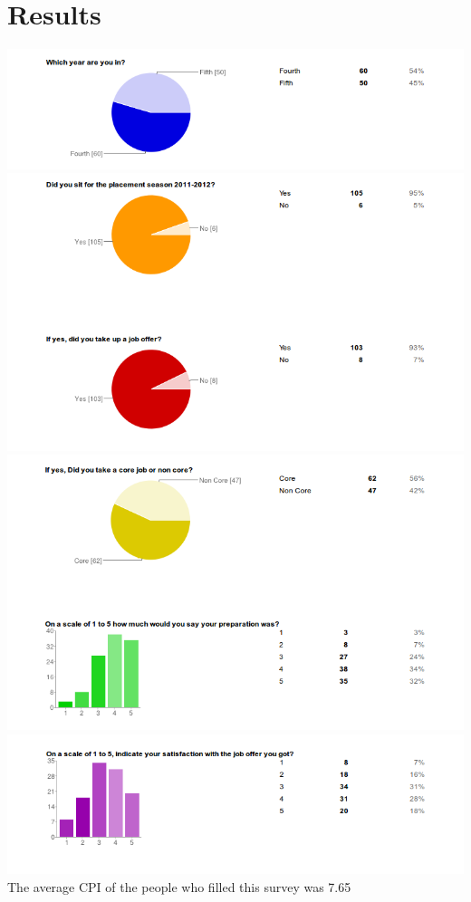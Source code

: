 \documentclass[a4paper,12pt]{report}
\begin{document}
\section{Results}
\includegraphics[scale=.5]{1}\\
\includegraphics[scale=.5]{2}\\
\includegraphics[scale=.5]{3}\\
\includegraphics[scale=.5]{4}\\
The average CPI of the people who filled this survey was 7.65
\end{document}
